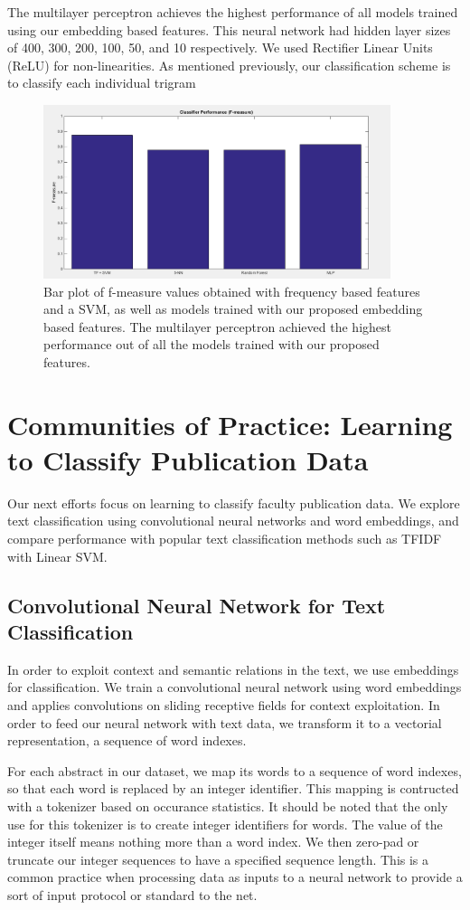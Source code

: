 \documentclass[12pt]{article}
\begin{document}
The multilayer perceptron achieves the highest performance of all models trained using our embedding based features. This neural
network had hidden layer sizes of 400, 300, 200, 100, 50, and 10 respectively. We used Rectifier Linear Units (ReLU) for non-linearities.
As mentioned previously, our classification scheme is to classify each individual trigram
\begin{figure}[H]
\centering
\includegraphics[height=2in, width=4in]{Images/classifier_fmeasure.png}
\caption{Bar plot of f-measure values obtained with frequency based features and a SVM, as well as models trained with our proposed embedding based features.
The multilayer perceptron achieved the highest performance out of all the models trained with our proposed features.}
\end{figure}


\section{Communities of Practice: Learning to Classify Publication Data}
Our next efforts focus on learning to classify faculty publication data. We explore text classification
using convolutional neural networks and word embeddings, and compare performance with popular text classification methods
such as TFIDF with Linear SVM.

\subsection{Convolutional Neural Network for Text Classification}
In order to exploit context and semantic relations in the text, we use embeddings for classification.
We train a convolutional neural network using word embeddings and applies convolutions on sliding
receptive fields for context exploitation. In order to feed our neural network with text data, we transform it to a vectorial
representation, a sequence of word indexes.

For each abstract in our dataset, we map its words to a sequence of word indexes,
so that each word is replaced by an integer identifier. This mapping is contructed with a tokenizer based on occurance statistics.
It should be noted that the only use for this tokenizer is to create integer identifiers for words. The value of the integer
itself means nothing more than a word index. We then zero-pad or truncate our integer sequences to have a specified sequence length. This is
a common practice when processing data as inputs to a neural network to provide a sort of input protocol or standard to the net.
\end{document}
